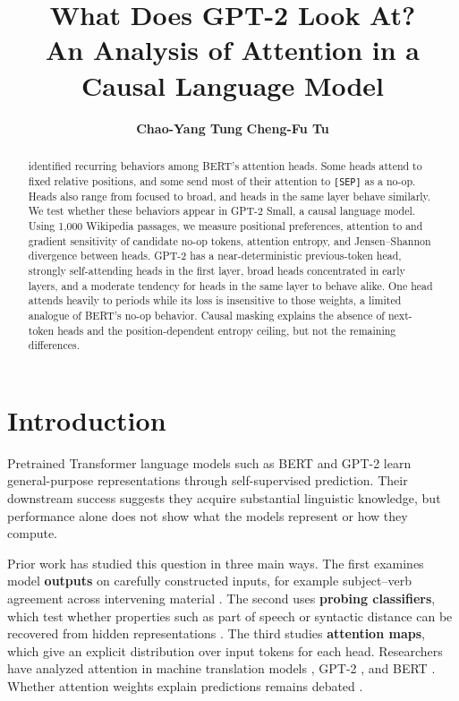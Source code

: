 \documentclass{article}
\title{What Does GPT-2 Look At?\\{\Large An Analysis of Attention in a Causal Language Model}}
\author{%
  \textbf{Chao-Yang Tung}
  \And
  \textbf{Cheng-Fu Tu}
}
\newcommand{\SEP}{\texttt{[SEP]}}
\begin{document}
\maketitle

\begin{abstract}
  \citet{clark2019} identified recurring behaviors among BERT's attention heads. Some heads attend to fixed relative positions, and some send most of their attention to \SEP{} as a no-op. Heads also range from focused to broad, and heads in the same layer behave similarly. We test whether these behaviors appear in GPT-2 Small, a causal language model. Using 1,000 Wikipedia passages, we measure positional preferences, attention to and gradient sensitivity of candidate no-op tokens, attention entropy, and Jensen--Shannon divergence between heads. GPT-2 has a near-deterministic previous-token head, strongly self-attending heads in the first layer, broad heads concentrated in early layers, and a moderate tendency for heads in the same layer to behave alike. One head attends heavily to periods while its loss is insensitive to those weights, a limited analogue of BERT's no-op behavior. Causal masking explains the absence of next-token heads and the position-dependent entropy ceiling, but not the remaining differences.
\end{abstract}

\section{Introduction}
\label{sec:intro}

Pretrained Transformer language models \citep{vaswani2017} such as BERT \citep{devlin2019} and GPT-2 \citep{radford2019} learn general-purpose representations through self-supervised prediction. Their downstream success suggests they acquire substantial linguistic knowledge, but performance alone does not show what the models represent or how they compute.

Prior work has studied this question in three main ways. The first examines model \textbf{outputs} on carefully constructed inputs, for example subject--verb agreement across intervening material \citep{linzen2016,goldberg2019}. The second uses \textbf{probing classifiers}, which test whether properties such as part of speech or syntactic distance can be recovered from hidden representations \citep{conneau2018,tenney2019,hewitt2019}. The third studies \textbf{attention maps}, which give an explicit distribution over input tokens for each head. Researchers have analyzed attention in machine translation models \citep{raganato2018,voita2019}, GPT-2 \citep{vig2019}, and BERT \citep{kovaleva2019}. Whether attention weights explain predictions remains debated \citep{jain2019,serrano2019,wiegreffe2019}.
\end{document}
